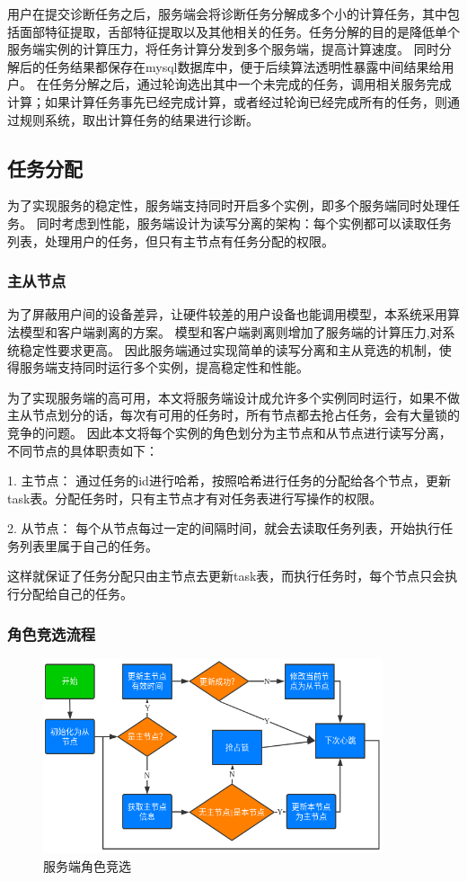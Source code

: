 用户在提交诊断任务之后，服务端会将诊断任务分解成多个小的计算任务，其中包括面部特征提取，舌部特征提取以及其他相关的任务。任务分解的目的是降低单个服务端实例的计算压力，将任务计算分发到多个服务端，提高计算速度。
同时分解后的任务结果都保存在mysql数据库中，便于后续算法透明性暴露中间结果给用户。
在任务分解之后，通过轮询选出其中一个未完成的任务，调用相关服务完成计算；如果计算任务事先已经完成计算，或者经过轮询已经完成所有的任务，则通过规则系统，取出计算任务的结果进行诊断。



\subsection{任务分配}
为了实现服务的稳定性，服务端支持同时开启多个实例，即多个服务端同时处理任务。
同时考虑到性能，服务端设计为读写分离的架构：每个实例都可以读取任务列表，处理用户的任务，但只有主节点有任务分配的权限。


\subsubsection{主从节点}
为了屏蔽用户间的设备差异，让硬件较差的用户设备也能调用模型，本系统采用算法模型和客户端剥离的方案。
模型和客户端剥离则增加了服务端的计算压力,对系统稳定性要求更高。
因此服务端通过实现简单的读写分离和主从竞选的机制，使得服务端支持同时运行多个实例，提高稳定性和性能。


为了实现服务端的高可用，本文将服务端设计成允许多个实例同时运行，如果不做主从节点划分的话，每次有可用的任务时，所有节点都去抢占任务，会有大量锁的竞争的问题。
因此本文将每个实例的角色划分为主节点和从节点进行读写分离，不同节点的具体职责如下：

1. 主节点： 通过任务的id进行哈希，按照哈希进行任务的分配给各个节点，更新task表。分配任务时，只有主节点才有对任务表进行写操作的权限。

2. 从节点： 每个从节点每过一定的间隔时间，就会去读取任务列表，开始执行任务列表里属于自己的任务。

这样就保证了任务分配只由主节点去更新task表，而执行任务时，每个节点只会执行分配给自己的任务。

\subsubsection{角色竞选流程}
\begin{figure}
    \centering
    \includegraphics[width=10cm]{images/slave-master.png}
    \caption{服务端角色竞选}
    \label{fig:slave_master}
\end{figure}

